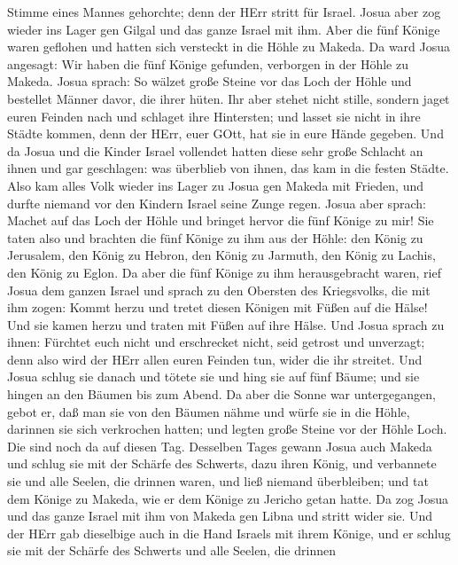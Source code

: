 Stimme eines Mannes gehorchte; denn der HErr stritt für Israel.
 Josua aber zog wieder ins Lager gen Gilgal und das ganze
Israel mit ihm.  Aber die fünf Könige waren geflohen und
hatten sich versteckt in die Höhle zu Makeda.  Da ward
Josua angesagt: Wir haben die fünf Könige gefunden, verborgen in der
Höhle zu Makeda.  Josua sprach: So wälzet große Steine vor
das Loch der Höhle und bestellet Männer davor, die ihrer hüten.
 Ihr aber stehet nicht stille, sondern jaget euren Feinden
nach und schlaget ihre Hintersten; und lasset sie nicht in ihre Städte
kommen, denn der HErr, euer GOtt, hat sie in eure Hände gegeben.
 Und da Josua und die Kinder Israel vollendet hatten diese
sehr große Schlacht an ihnen und gar geschlagen: was überblieb von
ihnen, das kam in die festen Städte.  Also kam alles Volk
wieder ins Lager zu Josua gen Makeda mit Frieden, und durfte niemand vor
den Kindern Israel seine Zunge regen.  Josua aber sprach:
Machet auf das Loch der Höhle und bringet hervor die fünf Könige zu mir!
 Sie taten also und brachten die fünf Könige zu ihm aus der
Höhle: den König zu Jerusalem, den König zu Hebron, den König zu
Jarmuth, den König zu Lachis, den König zu Eglon.  Da aber
die fünf Könige zu ihm herausgebracht waren, rief Josua dem ganzen
Israel und sprach zu den Obersten des Kriegsvolks, die mit ihm zogen:
Kommt herzu und tretet diesen Königen mit Füßen auf die Hälse! Und sie
kamen herzu und traten mit Füßen auf ihre Hälse.  Und Josua
sprach zu ihnen: Fürchtet euch nicht und erschrecket nicht, seid getrost
und unverzagt; denn also wird der HErr allen euren Feinden tun, wider
die ihr streitet.  Und Josua schlug sie danach und tötete
sie und hing sie auf fünf Bäume; und sie hingen an den Bäumen bis zum
Abend.  Da aber die Sonne war untergegangen, gebot er, daß
man sie von den Bäumen nähme und würfe sie in die Höhle, darinnen sie
sich verkrochen hatten; und legten große Steine vor der Höhle Loch. Die
sind noch da auf diesen Tag.  Desselben Tages gewann Josua
auch Makeda und schlug sie mit der Schärfe des Schwerts, dazu ihren
König, und verbannete sie und alle Seelen, die drinnen waren, und ließ
niemand überbleiben; und tat dem Könige zu Makeda, wie er dem Könige zu
Jericho getan hatte.  Da zog Josua und das ganze Israel mit
ihm von Makeda gen Libna und stritt wider sie.  Und der
HErr gab dieselbige auch in die Hand Israels mit ihrem Könige, und er
schlug sie mit der Schärfe des Schwerts und alle Seelen, die drinnen
